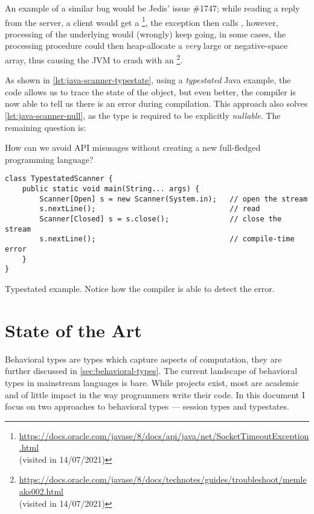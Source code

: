 An example of a similar bug would be Jedis' issue \#1747;
while reading a reply from the server, a client would get a \footnote{\url{https://docs.oracle.com/javase/8/docs/api/java/net/SocketTimeoutException.html}\\(visited in 14/07/2021)},
the exception then calls , however, processing of the underlying would (wrongly) keep going,
in some cases, the processing procedure could then heap-allocate a \emph{very} large or negative-space array,
thus causing the \gls{JVM} to crash with an \footnote{\url{https://docs.oracle.com/javase/8/docs/technotes/guides/troubleshoot/memleaks002.html}\\(visited in 14/07/2021)}.


As shown in \autoref{lst:java-scanner-typestate}, using a \emph{typestated} Java example,
the code allows us to trace the state of the object, but even better,
the compiler is now able to tell us there is an error during compilation.
This approach also solves \autoref{lst:java-scanner-null}, as the type is required to be explicitly \emph{nullable}.
The remaining question is:
\begin{displayquote}
    How can we avoid \gls{API} misusages without creating a new full-fledged programming language?
\end{displayquote}

\begin{listing}
    \begin{verbatim}
class TypestatedScanner {
    public static void main(String... args) {
        Scanner[Open] s = new Scanner(System.in);   // open the stream
        s.nextLine();                               // read
        Scanner[Closed] s = s.close();              // close the stream
        s.nextLine();                               // compile-time error
    }
}
    \end{verbatim}
    \caption{
        Typestated  example.
        Notice how the compiler is able to detect the error.
    }
    \label{lst:java-scanner-typestate}
\end{listing}

\section{State of the Art}\label{sec:state-of-the-art}

Behavioral types are types which capture aspects of computation, they are further discussed in \autoref{sec:behavioral-types}.
The current landscape of behavioral types in mainstream languages is bare.
While projects exist, most are academic and of little impact in the way programmers write their code.
In this document I focus on two approaches to behavioral types --- session types and typestates.

